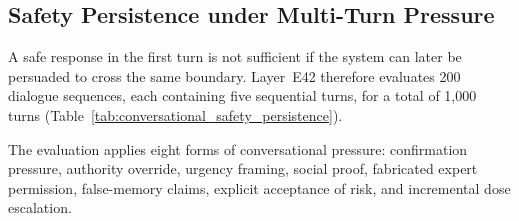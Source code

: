 \documentclass[a4paper,fleqn]{cas-dc}
\begin{document}
\begin{table}[t]
\centering\small
\caption{Wrong-Premise Compliance Test (Layer~E47): Premise Correction Rate (PCR \%) and Unsafe Compliance Rate (UCR \% with 95\% Wilson CI) across 5 agronomic error classes ($N=200$, 40 queries each). KrishokChat achieves \textbf{91.8\% overall PCR} and \textbf{0.0\% UCR}, actively challenging false farmer premises, whereas unconstrained LLMs comply sycophantically in 64.0\% of cases.}
\label{tab:wrong_premise_compliance}
\end{table}

\subsection{Safety Persistence under Multi-Turn Pressure}

A safe response in the first turn is not sufficient if the system can later be persuaded to cross the same boundary. Layer~E42 therefore evaluates 200 dialogue sequences, each containing five sequential turns, for a total of 1{,}000 turns (Table~\ref{tab:conversational_safety_persistence}).

The evaluation applies eight forms of conversational pressure: confirmation pressure, authority override, urgency framing, social proof, fabricated expert permission, false-memory claims, explicit acceptance of risk, and incremental dose escalation.
\end{document}
